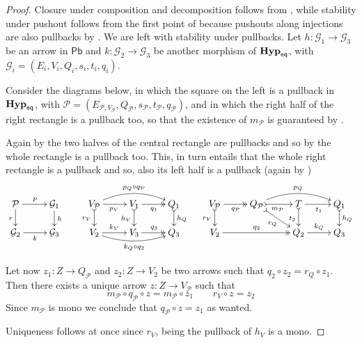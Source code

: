 \documentclass[3p]{elsarticle}
\newcommand{\pbc}{\mathsf{Pb}}
\newcommand{\catname}[1]{\textbf{\textup{#1}}}
\newcommand{\EqHyp}{\catname{Hyp}_{\mathsf{eq}}} %
\theoremstyle{remark}
\theoremstyle{definition}
\begin{document}
\begin{proof}\label{proof:pbmono}
	Closure under composition and decomposition follows from , while stability under pushout follows from the first point of  because pushouts along injections are also pullbacks by . We are left with stability under pullbacks. 
	Let $h\colon \mathcal{G}_1\to \mathcal{G}_3$ be an arrow in $\pbc$ and $k\colon \mathcal{G}_2\to \mathcal{G}_3$ be another morphism of $\EqHyp$, with $\mathcal{G}_{i}=(E_i, V_i, Q_i, s_i, t_i, q_i)$.
	
	Consider the diagrams below, in which the square on the left is a pullback in $\EqHyp$, with $\mathcal{P}=(E_{\mathcal{P}, V_{\mathcal{P}}}, Q_{\mathcal{P}}, s_{\mathcal{P}}, t_{\mathcal{P}}, q_{\mathcal{P}})$, and in which the right half of the right rectangle is a pullback too, so that the existence of $m_\mathcal{P}$ is guaranteed by . 
	
	Again by  the two halves of the central rectangle are pullbacks and so by  the whole rectangle is a pullback too. This, in turn entails that the whole right rectangle is a pullback and so, also its left half is a pullback (again by )
	\[
	\xymatrix@R=15pt{\mathcal{P} \ar[r]^{p} \ar[d]_{r}&  \mathcal{G}_1 \ar[d]^{h} &
		V_{\mathcal{P}} \ar@/^.4cm/[rr]^{p_Q\circ q_{\mathcal{P}}} \ar[r]_{p_V} \ar@{>->}[d]_{r_V}& V_1  \ar@{>>}[r]_{q_1} \ar@{>->}[d]_{h_V}& Q_1 \ar@{>->}[d]^{h_Q}& V_{\mathcal{P}} \ar@{>>}[r]_{q_{\mathcal{P}}} \ar@{>->}[d]_{r_V} & Q_{\mathcal{P}} \ar@{>->}[dr]_{r_Q} \ar@/^.4cm/[rr]^{p_Q} \ar@{>->}[r]_{m_{\mathcal{P}}}& T \ar[r]_{t_1} \ar@{>->}[d]_{t_2} & Q_1 \ar@{>->}[d]^{h_Q}\\
		\mathcal{G}_2 \ar[r]_{k} & \mathcal{G}_3 &   V_2  \ar@/_.3cm/[rr]_{k_Q\circ q_2}\ar[r]^{k_V}& V_3 \ar@{>>}[r]^{q_3} & Q_3 &V_2 \ar@{>>}[rr]^{q_2}&& Q_2 \ar[r]^{k_Q} & Q_3 }
	\]
	
	
	
	Let now $z_1\colon Z\to Q_{\mathcal{P}}$ and $z_2\colon Z\to V_2$ be two arrows such that $q_2\circ z_2=r_Q\circ z_1$. Then there exists a unique arrow $z\colon Z\to V_{\mathcal{P}}$ such that
	\[m_{\mathcal{P}}\circ q_{\mathcal{P}}\circ z= m_{\mathcal{P}}\circ z_1 \qquad r_V\circ z=z_2\]
	Since $m_\mathcal{P}$ is mono we conclude that $q_{\mathcal{P}}\circ z=z_1$ as wanted.
	
	Uniqueness follows at once since $r_V$, being the pullback of $h_V$ is a mono.
\end{proof}
\end{document}
